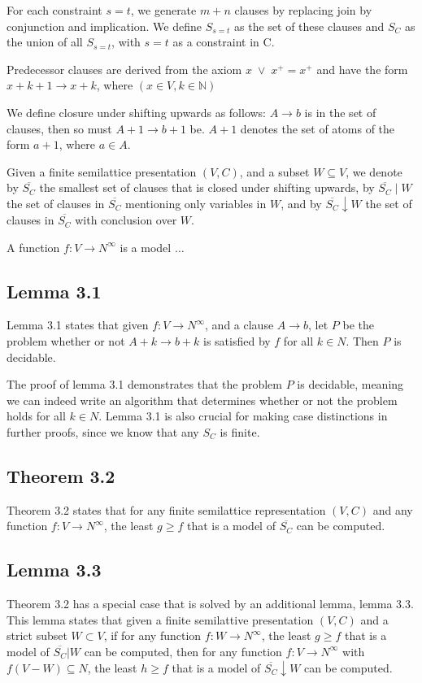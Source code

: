 For each constraint $s = t$, we generate $m + n$ clauses by replacing join by conjunction and implication.
We define $S_{s=t}$ as the set of these clauses and $S_C$ as the union of all $S_{s=t}$, with $s = t$ as a constraint in C.

Predecessor clauses are derived from the axiom $x \; \lor \; x^{+} = x^{+}$ and have the form
$x + k + 1 \rightarrow x + k$, where $(x \in V, k \in \mathbb{N})$

We define closure under shifting upwards as follows:
$A \rightarrow b$ is in the set of clauses, then so must $A + 1 \rightarrow b + 1$ be.
$A + 1$ denotes the set of atoms of the form $a + 1$, where $a \in A$.

Given a finite semilattice presentation $(V, C)$,
and a subset $W \subseteq V$, we denote by
$\overline{S_C}$ the smallest set of clauses that is closed under shifting upwards,
by $\overline{S_C} \mid W$ the set of clauses in $\overline{S_C}$
mentioning only variables in $W$, and by $\overline{S_C} \downarrow W$
the set of clauses in $\overline{S_C}$ with conclusion over $W$.

A function $f : V \rightarrow N^{\infty}$ is a model $\ldots$


\subsection{Lemma 3.1}

Lemma 3.1 states that given $f : V \rightarrow N^{\infty}$,
and a clause $A \rightarrow b$, let $P$ be the problem whether or not
$A + k \rightarrow b + k$ is satisfied by $f$ for all $k \in N$.
Then $P$ is decidable. \cite[p.~3]{mbezem}

The proof of lemma 3.1 demonstrates that the problem $P$
is decidable, meaning we can indeed write an algorithm that
determines whether or not the problem holds for all $k \in N$.
Lemma 3.1 is also crucial for making case distinctions
in further proofs, since we know that any $S_C$ is finite.

\subsection{Theorem 3.2}

Theorem 3.2 states that for any finite semilattice representation
$(V, C)$ and any function $f : V \rightarrow N^{\infty}$,
the least $g \ge f$ that is a model of $\overline{S_C}$ can be computed.
\cite[p.~3]{mbezem}

\subsection{Lemma 3.3}

Theorem 3.2 has a special case that is solved by an additional lemma,
lemma 3.3. This lemma states that given a finite semilattive presentation
$(V, C)$ and a strict subset $W \subset V$, if for any function
$f : W \rightarrow N^{\infty}$, the least $g \ge f$ that is a model of
$\overline{S_C}|W$ can be computed, then for any function
$f : V \rightarrow N^{\infty}$ with $f(V - W) \subseteq N$,
the least $h \ge f$ that is a model of $\overline{S_C}\downarrow W$ can be computed.
\cite[p.~3-4]{mbezem}
